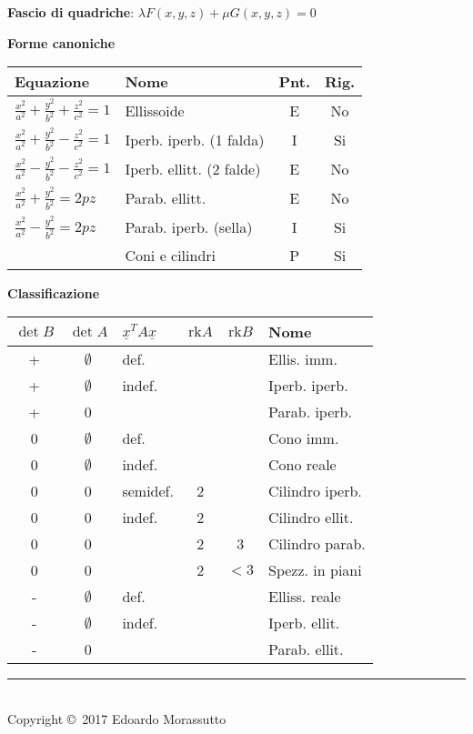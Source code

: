 \documentclass[10pt,landscape]{article}
\renewcommand{\vec}[1]{\underline{#1}}
\newcommand{\rk}{\mathrm{rk}}
\begin{document}
\begin{multicols}{3}
\textbf{Fascio di quadriche}: $\lambda F(x, y, z) + \mu G(x, y, z) = 0$

\textbf{Forme canoniche}
\begin{tabular}{llcc}
	\textbf{Equazione} & \textbf{Nome} & \textbf{Pnt.} & \textbf{Rig.} \\
	\hline
	$\frac{x^2}{a^2} + \frac{y^2}{b^2} + \frac{z^2}{c^2} = 1$ & Ellissoide & E & No \\
	$\frac{x^2}{a^2} + \frac{y^2}{b^2} - \frac{z^2}{c^2} = 1$ & Iperb. iperb. (1 falda) & I & Si \\
	$\frac{x^2}{a^2} - \frac{y^2}{b^2} - \frac{z^2}{c^2} = 1$ & Iperb. ellitt. (2 falde) & E & No \\
	$\frac{x^2}{a^2} + \frac{y^2}{b^2} = 2pz$ & Parab. ellitt. & E & No \\
	$\frac{x^2}{a^2} - \frac{y^2}{b^2} = 2pz$ & Parab. iperb. (sella) & I & Si \\
	 & Coni e cilindri & P & Si \\
\end{tabular}

\textbf{Classificazione}

\begin{tabular}{c|c|l|c|c|l}
	\boldmath$\det B$
	         & \boldmath$\det A$
	                       & \boldmath$\vec{x}^TA\vec{x}$
	                                  & \boldmath$\rk A$
	                                      & \boldmath$\rk B$
	                                             & \textbf{Nome} \\
	\hline
	+        & $\emptyset$ & def.     &   &      & Ellis. imm. \\
	+        & $\emptyset$ & indef.   &   &      & Iperb. iperb. \\
	+        & 0           &          &   &      & Parab. iperb. \\
	\hline
	0        & $\emptyset$ & def.     &   &      & Cono imm. \\
	0        & $\emptyset$ & indef.   &   &      & Cono reale \\
	0        & 0           & semidef. & 2 &      & Cilindro iperb. \\
	0        & 0           & indef.   & 2 &      & Cilindro ellit. \\
	0        & 0           &          & 2 & 3    & Cilindro parab. \\
	0        & 0           &          & 2 & $<3$ & Spezz. in piani \\
	\hline
	-        & $\emptyset$ & def.     &   &      & Elliss. reale \\
	-        & $\emptyset$ & indef.   &   &      & Iperb. ellit. \\
	-        & 0           &          &   &      & Parab. ellit. \\
\end{tabular}

\rule{0.3\linewidth}{0.25pt}
\scriptsize\\
Copyright \copyright\ 2017 Edoardo Morassutto
\end{multicols}
\end{document}
